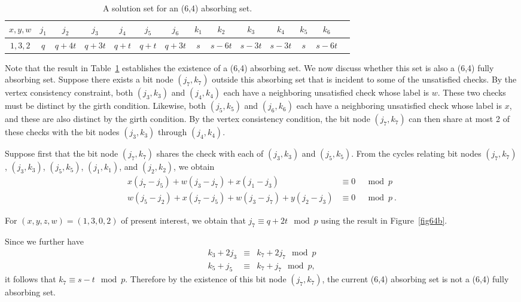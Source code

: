 \hspace{-0.2in}\small{\hspace{-0.2in}\begin{table}[ht]\vspace{-0.05in}\hspace{-0.2in}
\begin{tabular}{|c |c|c|c|c|c|c|c|c|c|c|c|c|c|}
  \hline
  $x,y,w$ & $j_1$ & $j_2$ & $j_3$ & $j_4$ & $j_5$ & $j_6$ & $k_1$ & $k_2$ & $k_3$ & $k_4$ & $k_5$ & $k_6$ \\
  \hline
$1,3,2$&  $q$ & $q+4t$ &  $q+3t$ &  $q+t$ &  $q+t$ & $q+3t$ & $s$
& $s-6t$ & $s-3t$ & $s-3t$ & $s$ &
  $s-6t$\\
  \hline
\end{tabular}
\caption{ A solution set for an (6,4) absorbing
set.}\label{table64b}
\end{table}}
\normalsize

Note that the result in Table~\ref{table64b} establishes the
existence of a (6,4) absorbing set. We now discuss whether this
set is also a (6,4) fully absorbing set. Suppose there exists a
bit node $(j_7,k_7)$ outside this absorbing set that is incident
to some of the unsatisfied checks. By the vertex consistency
constraint, both $(j_3,k_3)$ and $(j_4,k_4)$ each have a
neighboring unsatisfied check whose label is $w$. These two checks
must be distinct by the girth condition. Likewise, both
$(j_5,k_5)$ and $(j_6,k_6)$ each have a neighboring unsatisfied
check whose label is $x$, and these are also distinct by the girth
condition. By the vertex consistency condition, the bit node
$(j_7,k_7)$ can then share at most 2 of these checks with the bit
nodes $(j_3,k_3)$ through $(j_4,k_4)$.

Suppose first that the bit node $(j_7,k_7)$ shares the check with
each of $(j_3,k_3)$ and $(j_5,k_5)$. From the cycles relating bit
nodes $(j_7,k_7)$, $(j_3,k_3)$, $(j_5,k_5)$, $(j_1,k_1)$, and
$(j_2,k_2)$, we obtain
\begin{eqnarray*}
x(j_7-j_5)+w(j_3-j_7)+x(j_1-j_3) &\equiv 0& \mod p\\
w(j_5-j_2)+x(j_7-j_5)+w(j_3-j_7)+y(j_2-j_3) &\equiv 0& \mod p~.
\end{eqnarray*}

For $(x,y,z,w)=(1,3,0,2)$ of present interest, we obtain that $j_7
\equiv q+2t \mod p$ using the result in Figure~\ref{fig64b}.

Since we further have
\begin{eqnarray*}
k_3+2j_3 &\equiv & k_7+2j_7 \mod p\\
k_5+j_5 & \equiv & k_7 +j_7 \mod p,
\end{eqnarray*}
it follows that $k_7 \equiv s-t \mod p$. Therefore by the
existence of this bit node $(j_7,k_7)$, the current (6,4)
absorbing set is not a (6,4) fully absorbing set.

